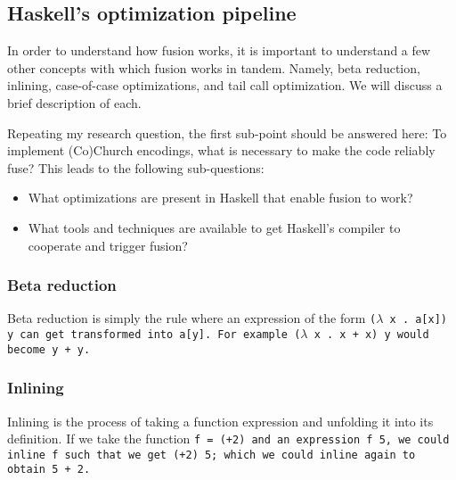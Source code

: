 \subsection{Haskell's optimization pipeline}
In order to understand how fusion works, it is important to understand a few other concepts with which fusion works in tandem.
Namely, beta reduction, inlining, case-of-case optimizations, and tail call optimization.
We will discuss a brief description of each.

Repeating my research question, the first sub-point should be answered here:
To implement (Co)Church encodings, what is necessary to make the code reliably fuse? This leads to the following sub-questions:
\begin{itemize}[noitemsep]
  \item What optimizations are present in Haskell that enable fusion to work?
  \item What tools and techniques are available to get Haskell's compiler to cooperate and trigger fusion?
\end{itemize}

\subsubsection{Beta reduction}
Beta reduction is simply the rule where an expression of the form \tt{($\lambda$ x . a[x]) y} can get transformed into \tt{a[y]}.
For example \tt{($\lambda$ x . x + x) y} would become \tt{y + y}.
\subsubsection{Inlining}
Inlining is the process of taking a function expression and unfolding it into its definition.
If we take the function \tt{f = (+2)} and an expression \tt{f 5}, we could inline \tt{f} such that we get \tt{(+2) 5}; which we could inline again to obtain \tt{5 + 2}.
